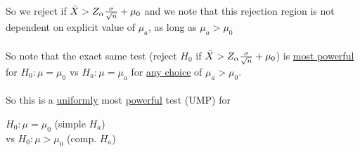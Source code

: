 So we reject if \quad $\bar{X} > Z_\alpha \frac{\sigma}{\sqrt{n}} + \mu_0$ \quad and we note that this rejection region is not dependent on explicit value of $\mu_a$, as long as $\mu_a > \mu_0$\\\\
So note that the exact same test (reject $H_0$ if $\bar{X} > Z_\alpha \frac{\sigma}{\sqrt{n}} + \mu_0$) is \underline{most powerful} for $H_0: \mu = \mu_0$ vs $H_a: \mu = \mu_a$ for \underline{any choice} of $\mu_a > \mu_0$.\\\\
So this is a \underline{uniformly} most \underline{powerful} test (UMP) for 
\begin{center}
	$H_0: \mu = \mu_0$ (simple $H_a$)\\
	vs $H_0: \mu > \mu_0$ (comp. $H_a$)
\end{center}